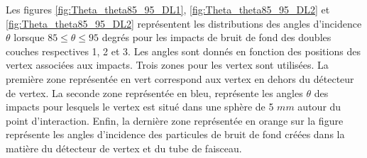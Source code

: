   \medskip

  Les figures \ref{fig:Theta_theta85_95_DL1}, \ref{fig:Theta_theta85_95_DL2} et \ref{fig:Theta_theta85_95_DL2} repr\'esentent les distributions des angles d'incidence $\theta$ lorsque $85 \leq \theta \leq 95$ degr\'es pour les impacts de bruit de fond des doubles couches respectives 1, 2 et 3. Les angles sont donn\'es en fonction des positions des vertex associ\'ees aux impacts. Trois zones pour les vertex sont utilis\'ees. La premi\`ere zone repr\'esent\'ee en vert correspond aux vertex en dehors du détecteur de vertex. La seconde zone repr\'esent\'ee en bleu, repr\'esente les angles $\theta$ des impacts pour lesquels le vertex est situ\'e dans une sph\`ere de 5 $mm$ autour du point d'interaction. Enfin, la derni\`ere zone repr\'esent\'ee en orange sur la figure repr\'esente les angles d'incidence des particules de bruit de fond cr\'e\'ees dans la mati\`ere du d\'etecteur de vertex et du tube de faisceau.

